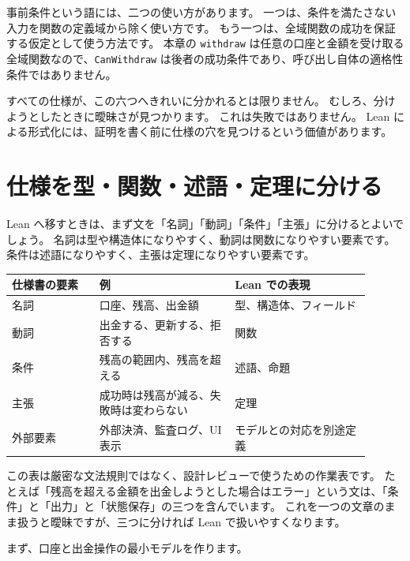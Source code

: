 事前条件という語には、二つの使い方があります。
一つは、条件を満たさない入力を関数の定義域から除く使い方です。
もう一つは、全域関数の成功を保証する仮定として使う方法です。
本章の \texttt{withdraw} は任意の口座と金額を受け取る全域関数なので、\texttt{CanWithdraw} は後者の成功条件であり、呼び出し自体の適格性条件ではありません。

すべての仕様が、この六つへきれいに分かれるとは限りません。
むしろ、分けようとしたときに曖昧さが見つかります。
これは失敗ではありません。
Lean による形式化には、証明を書く前に仕様の穴を見つけるという価値があります。

\section{仕様を型・関数・述語・定理に分ける}

Lean へ移すときは、まず文を「名詞」「動詞」「条件」「主張」に分けるとよいでしょう。
名詞は型や構造体になりやすく、動詞は関数になりやすい要素です。
条件は述語になりやすく、主張は定理になりやすい要素です。

\begin{center}
\begin{tabular}{p{0.22\linewidth}p{0.34\linewidth}p{0.34\linewidth}}
\toprule
仕様書の要素 & 例 & Lean での表現 \\
\midrule
名詞 & 口座、残高、出金額 & 型、構造体、フィールド \\
動詞 & 出金する、更新する、拒否する & 関数 \\
条件 & 残高の範囲内、残高を超える & 述語、命題 \\
主張 & 成功時は残高が減る、失敗時は変わらない & 定理 \\
外部要素 & 外部決済、監査ログ、UI表示 & モデルとの対応を別途定義 \\
\bottomrule
\end{tabular}
\end{center}

この表は厳密な文法規則ではなく、設計レビューで使うための作業表です。
たとえば「残高を超える金額を出金しようとした場合はエラー」という文は、「条件」と「出力」と「状態保存」の三つを含んでいます。
これを一つの文章のまま扱うと曖昧ですが、三つに分ければ Lean で扱いやすくなります。

まず、口座と出金操作の最小モデルを作ります。

